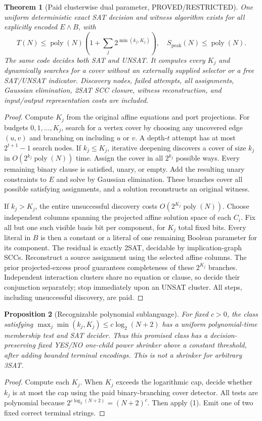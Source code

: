 \documentclass[11pt]{article}
\newtheorem{theorem}{Theorem}
\newtheorem{proposition}[theorem]{Proposition}
\newcommand{\poly}{\operatorname{poly}}
\begin{document}
\begin{theorem}[Paid clusterwise dual parameter, PROVED/RESTRICTED]
One uniform deterministic exact SAT decision and witness algorithm exists for all explicitly encoded $E\land B$, with
\[
 \boxed{T(N)\le\poly(N)\left(1+\sum_j2^{\min(k_j,K_j)}\right),\quad
 S_{\mathrm{peak}}(N)\le\poly(N).}\tag{1}
\]
The same code decides both SAT and UNSAT. It computes every $K_j$ and dynamically searches for a cover without an externally supplied selector or a free SAT/UNSAT indicator. Discovery nodes, failed attempts, all assignments, Gaussian elimination, 2SAT SCC closure, witness reconstruction, and input/output representation costs are included.
\end{theorem}
\begin{proof}
Compute $K_j$ from the original affine equations and port projections. For budgets $0,1,\ldots,K_j$, search for a vertex cover by choosing any uncovered edge $(u,v)$ and branching on including $u$ or $v$. A depth-$t$ attempt has at most $2^{t+1}-1$ search nodes. If $k_j\le K_j$, iterative deepening discovers a cover of size $k_j$ in $O(2^{k_j}\poly(N))$ time. Assign the cover in all $2^{k_j}$ possible ways. Every remaining binary clause is satisfied, unary, or empty. Add the resulting unary constraints to $E$ and solve by Gaussian elimination. These branches cover all possible satisfying assignments, and a solution reconstructs an original witness.

If $k_j>K_j$, the entire unsuccessful discovery costs $O(2^{K_j}\poly(N))$. Choose independent columns spanning the projected affine solution space of each $C_i$. Fix all but one such visible basis bit per component, for $K_j$ total fixed bits. Every literal in $B$ is then a constant or a literal of one remaining Boolean parameter for its component. The residual is exactly 2SAT, decidable by implication-graph SCCs. Reconstruct a source assignment using the selected affine columns. The prior projected-excess proof guarantees completeness of these $2^{K_j}$ branches. Independent interaction clusters share no equation or clause, so decide their conjunction separately; stop immediately upon an UNSAT cluster. All steps, including unsuccessful discovery, are paid.\end{proof}

\begin{proposition}[Recognizable polynomial sublanguage]
For fixed $c>0$, the class satisfying $\max_j\min(k_j,K_j)\le c\log_2(N+2)$ has a uniform polynomial-time membership test and SAT decider. Thus this promised class has a decision-preserving fixed YES/NO one-child power shrinker above a constant threshold, after adding bounded terminal encodings. This is not a shrinker for arbitrary 3SAT.
\end{proposition}
\begin{proof}
Compute each $K_j$. When $K_j$ exceeds the logarithmic cap, decide whether $k_j$ is at most the cap using the paid binary-branching cover detector. All tests are polynomial because $2^{c\log_2(N+2)}=(N+2)^c$. Then apply (1). Emit one of two fixed correct terminal strings.\end{proof}
\end{document}

